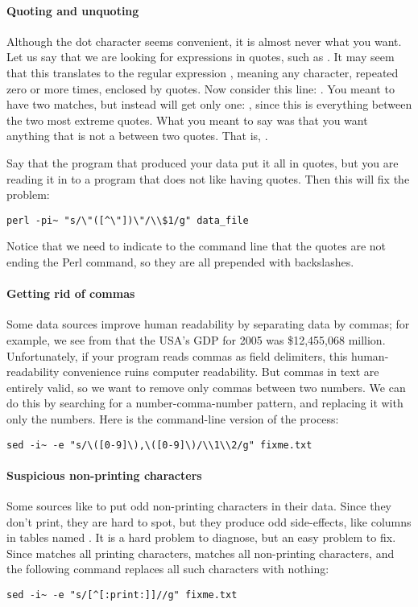 \paragraph{Quoting and unquoting}
Although the dot character seems convenient, it is almost never what you
want. Let us say that we are looking for expressions in quotes,
such as . It may seem that this translates to the regular
expression , meaning any character, repeated zero or more
times, enclosed by quotes. Now consider this line: . You meant to have two matches, but instead will get only
one: , since this is everything between the
two most extreme quotes. What you meant to say was that you want anything
that is not a  between two quotes. That is, . 

Say that the program that produced your data put it all in
quotes, but you are reading it in to a  program that does not like
having quotes. Then this will fix the problem:
\begin{lstlisting}
perl -pi~ "s/\"([^\"])\"/\\$1/g" data_file
\end{lstlisting}
Notice that we need to indicate to the command line that the quotes are
not ending the Perl command, so they are all prepended with backslashes.

\paragraph{Getting rid of commas}
Some data sources improve human readability by separating data by
commas; for example, we see from  that the USA's GDP for
2005 was \$12,455,068 million. Unfortunately, if your program reads
commas as field delimiters, this human-readability convenience ruins
computer readability. But commas in text are entirely valid, so we want
to remove only commas between two numbers. We can do this by searching
for a number-comma-number pattern, and replacing it with only the
numbers. Here is the  command-line version of the process:
\begin{lstlisting}
sed -i~ -e "s/\([0-9]\),\([0-9]\)/\\1\\2/g" fixme.txt
\end{lstlisting}

\paragraph{Suspicious non-printing characters} Some sources like to
put odd non-printing characters in their data. Since they don't print,
they are hard to spot, but they produce odd side-effects, like columns
in tables named . It is a hard
problem to diagnose, but an easy problem to fix. Since \bi{[:print:]}
matches all printing characters, \bi{[\that{}[:print:]]} matches all
non-printing characters, and the following command replaces all
such characters with nothing: 
\begin{lstlisting}
sed -i~ -e "s/[^[:print:]]//g" fixme.txt
\end{lstlisting}


